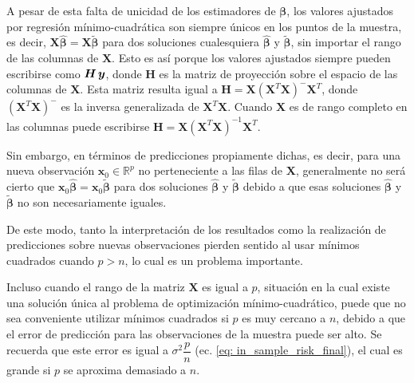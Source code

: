 \documentclass[a4paper,12pt]{report}
\begin{document}
A pesar de esta falta de unicidad de los estimadores de $\boldsymbol{\beta}$, los valores ajustados por regresión mínimo-cuadrática son siempre únicos en los puntos de la muestra, es decir, ${\boldsymbol{X}\boldsymbol{\hat{\beta}}=\boldsymbol{X}\boldsymbol{\tilde{\beta}}}$ para dos soluciones cualesquiera $\boldsymbol{\hat{\beta}}$ y $\boldsymbol{\tilde{\beta}}$, sin importar el rango de las columnas de $\boldsymbol{X}$. Esto es así porque los valores ajustados siempre pueden escribirse como $\boldsymbol{H} \hspace{0.05cm} \boldsymbol{y}$, donde $\boldsymbol{H}$ es la matriz de proyección sobre el espacio de las columnas de $\boldsymbol{X}$. Esta matriz resulta igual a $\boldsymbol{H}=\boldsymbol{X}(\boldsymbol{X}^T\boldsymbol{X})^-\boldsymbol{X}^T$, donde $(\boldsymbol{X}^T\boldsymbol{X})^-$ es la inversa generalizada de $\boldsymbol{X}^T\boldsymbol{X}$. Cuando $\boldsymbol{X}$ es de rango completo en las columnas puede escribirse $\boldsymbol{H}=\boldsymbol{X}(\boldsymbol{X}^T\boldsymbol{X})^{-1}\boldsymbol{X}^T$.

Sin embargo, en términos de predicciones propiamente dichas, es decir, para una nueva observación $\boldsymbol{x}_0 \in \mathbb{R}^p$ no perteneciente a las filas de $\boldsymbol{X}$, generalmente no será cierto que ${\boldsymbol{x}_0\boldsymbol{\hat{\beta}}=\boldsymbol{x}_0\boldsymbol{\tilde{\beta}}}$ para dos soluciones $\boldsymbol{\hat{\beta}}$ y $\boldsymbol{\tilde{\beta}}$ debido a que esas soluciones $\boldsymbol{\hat{\beta}}$ y $\boldsymbol{\tilde{\beta}}$ no son necesariamente iguales.

De este modo, tanto la interpretación de los resultados como la realización de predicciones sobre nuevas observaciones pierden sentido al usar mínimos cuadrados cuando $p>n$, lo cual es un problema importante.

Incluso cuando el rango de la matriz $\boldsymbol{X}$ es igual a $p$, situación en la cual existe una solución única al problema de optimización mínimo-cuadrático, puede que no sea conveniente utilizar mínimos cuadrados si $p$ es muy cercano a $n$, debido a que el error de predicción para las observaciones de la muestra puede ser alto. Se recuerda que este error es igual a $\sigma^2 \dfrac{p}{n}$ (ec. \ref{eq: in_sample_risk_final}), el cual es grande si $p$ se aproxima demasiado a $n$.
\end{document}
